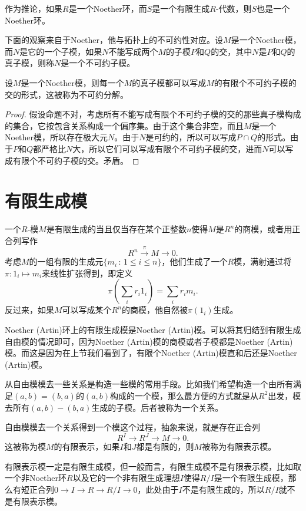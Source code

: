作为推论，如果$R$是一个Noether环，而$S$是一个有限生成$R$-代数，则$S$也是一个Noether环。

\para 下面的观察来自于Noether，他与拓扑上的不可约性对应。设$M$是一个Noether模，而$N$是它的一个子模，如果$N$不能写成两个$M$的子模$P$和$Q$的交，其中$N$是$P$和$Q$的真子模，则称$N$是一个不可约子模。

\begin{pro}\label{irrde}
设$M$是一个Noether模，则每一个$M$的真子模都可以写成$M$的有限个不可约子模的交的形式，这被称为不可约分解。
\end{pro}

\begin{proof}
	假设命题不对，考虑所有不能写成有限个不可约子模的交的那些真子模构成的集合，它按包含关系构成一个偏序集。由于这个集合非空，而且$M$是一个Noether模，所以存在极大元$N$。由于$N$是可约的，所以可以写成$P\cap Q$的形式。由于$P$和$Q$都严格比$N$大，所以它们可以写成有限个不可约子模的交，进而$N$可以写成有限个不可约子模的交。矛盾。
\end{proof}

\section{有限生成模}

\para 一个$R$-模$M$是有限生成的当且仅当存在某个正整数$n$使得$M$是$R^n$的商模，或者用正合列写作
\[
	R^n \xrightarrow{\pi} M\to 0.
\]
考虑$M$的一组有限的生成元$\{m_i\,:\, 1\leq i\leq n\}$，他们生成了一个$R$模，满射通过将$\pi:1_i\mapsto m_i$来线性扩张得到，即定义
\[
	\pi\left(\sum_i r_i 1_i\right)=\sum_i r_i m_i.
\]
反过来，如果$M$可以写成某个$R^n$的商模，他自然被$\pi(1_i)$生成。

\para Noether (Artin)环上的有限生成模是Noether (Artin)模。可以将其归结到有限生成自由模的情况即可，因为Noether (Artin)模的商模或者子模都是Noether (Artin)模。而这是因为在上节我们看到了，有限个Noether (Artin)模直和后还是Noether (Artin)模。

\para 从自由模模去一些关系是构造一些模的常用手段。比如我们希望构造一个由所有满足$(a,b)=(b,a)$的$(a,b)$构成的一个模，那么最方便的方式就是从$R^2$出发，模去所有$(a,b)-(b,a)$生成的子模。后者被称为一个关系。

自由模模去一个关系得到一个模这个过程，抽象来说，就是存在正合列
\[
	R^I\to R^J \to M\to 0.
\]
这被称为模$M$的有限表示，如果$I$和$J$都是有限的，则$M$被称为有限表示模。

有限表示模一定是有限生成模，但一般而言，有限生成模不是有限表示模，比如取一个非Noether环$R$以及它的一个非有限生成理想$I$使得$R/I$是一个有限生成模，那么有短正合列$0\to I\to R \to R/I\to 0$，此处由于$I$不是有限生成的，所以$R/I$就不是有限表示模。\endpara

